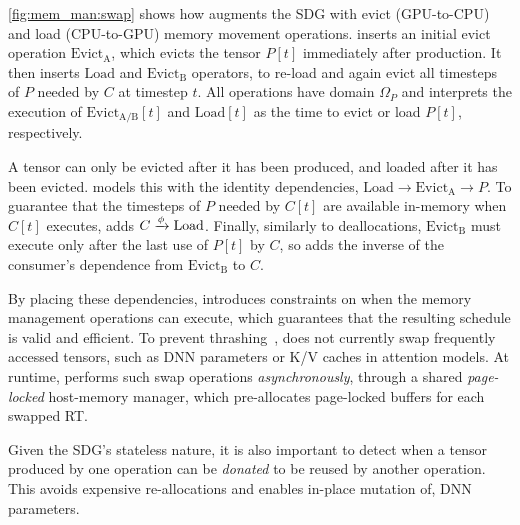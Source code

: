 \F\ref{fig:mem_man:swap} shows how \sys{} augments the SDG with evict (GPU-to-CPU) and load (CPU-to-GPU) memory movement operations. 
\sys{} inserts an initial evict operation $\mathrm{Evict_A}$, which evicts the tensor $P[t]$ immediately after production.
It then inserts $\mathrm{Load}$ and $\mathrm{Evict_B}$ operators, to re-load and again evict all timesteps of $P$ needed by $C$ at timestep $t$. All operations have domain $\Omega_P$ and \sys{} interprets the execution of $\mathrm{Evict_{A/B}}[t]$ and $\mathrm{Load}[t]$ as the time to evict or load $P[t]$, respectively.


A tensor can only be evicted after it has been produced, and loaded after it has been evicted. \sys{} models this with the identity dependencies, $\mathrm{Load} \rightarrow \mathrm{Evict_A} \rightarrow P$.
To guarantee that the timesteps of $P$ needed by $C[t]$ are available in-memory when $C[t]$ executes, \sys{} adds $C \xrightarrow{\smash{\phi}} \mathrm{Load}$.
Finally, similarly to deallocations, $\mathrm{Evict_B}$ must execute only after the last use of $P[t]$ by $C$, so \sys{} adds the inverse of the consumer's dependence from $\mathrm{Evict_B}$ to $C$.


By placing these dependencies, \sys{} introduces constraints on when the memory management operations can execute, which guarantees that the resulting schedule is valid and efficient.
To prevent thrashing~\cite{denning1968working}, \sys{} does not currently swap frequently accessed tensors, such as DNN parameters or K/V caches in attention models.
At runtime, \sys{} performs such swap operations \emph{asynchronously}, through a shared \emph{page-locked} host-memory manager, which pre-allocates page-locked buffers for each swapped RT.

 Given the SDG's stateless nature, it is also important to detect when a tensor produced by one operation can be \emph{donated} to be reused by another operation. This avoids expensive re-allocations and enables in-place mutation of, \eg DNN parameters.

